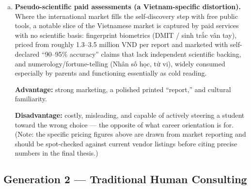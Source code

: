 \documentclass[a4paper]{article}
\begin{document}
\begin{enumerate}[a.]
    \par\smallskip\noindent
    \textbf{Disadvantage:} its spectrum-style output is
    harder for teenagers to act on and lacks a catchy label, so it is rarely used in Vietnamese
    school practice.

    \par\smallskip
    Across this category the pattern is consistent: free (or near-free),
    instant, and scalable, but one-off and self-report only, with no follow-up, and --- in
    isolation --- producing only a label with no path to a specific major or university.

    \item \textbf{Pseudo-scientific paid assessments (a Vietnam-specific distortion).} Where
    the international market fills the self-discovery step with free public tools, a notable
    slice of the Vietnamese market is captured by paid services with no scientific basis:
    fingerprint biometrics (DMIT / sinh trắc vân tay), priced from roughly 1.3--3.5 million VND
    per report and marketed with self-declared ``90--95\% accuracy'' claims that lack
    independent scientific backing, and numerology/fortune-telling (Nhân số học, tử vi), widely
    consumed especially by parents and functioning essentially as cold reading.

    \par\smallskip\noindent
    \textbf{Advantage:} strong marketing, a polished printed ``report,'' and cultural
    familiarity.

    \par\smallskip\noindent
    \textbf{Disadvantage:} costly, misleading, and capable of actively steering a
    student toward the wrong choice --- the opposite of what career orientation is for. (Note:
    the specific pricing figures above are drawn from market reporting and should be
    spot-checked against current vendor listings before citing precise numbers in the final
    thesis.)
\end{enumerate}

\subsection{Generation 2 --- Traditional Human Consulting}
\end{document}
